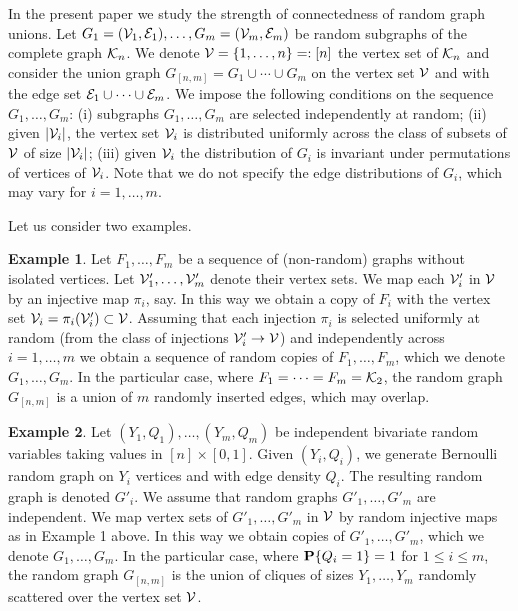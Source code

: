 \documentclass[11pt, a4paper]{article}
\newcommand{\PP}{{\bf{P}}}
\begin{document}
In the present paper we study the strength of connectedness
of random graph unions.
Let $G_1=({\cal V}_1,{\cal E}_1),\dots, G_m=({\cal V}_m,
{\cal E}_m)$ be random subgraphs of the complete graph 
${\cal K}_n$.  
We denote ${\cal V}=\{1,\dots, n\}=:[n]$
 the vertex set of ${\cal K}_n$ and consider
   the union graph $G_{[n,m]}=G_1\cup\cdots\cup G_m$ 
 on the vertex set ${\cal V}$ and with the edge 
 set ${\cal E}_1\cup\cdots\cup{\cal E}_m$.
%
We impose the following  conditions on the sequence 
$G_1,\dots, G_m$: (i) subgraphs $G_1,\dots, G_m$ are selected  independently at random;
 (ii)  given $|{\cal V}_i|$, the vertex set ${\cal V}_i$
is distributed uniformly across the class of subsets of ${\cal V}$ of size $|{\cal V}_i|$;
(iii) given ${\cal V}_i$ the distribution of $G_i$ is 
invariant under permutations of  vertices 
of ${\cal V}_i$. %
Note that we do not specify the edge distributions of 
$G_i$, which may vary for $i=1,\dots, m$. 

Let us consider  two examples.

{\bf{Example 1}}. Let  $F_1,\dots, F_m$
be a sequence of (non-random) graphs without isolated vertices. 
Let ${\cal V}_1',\dots,{\cal V}'_m$ denote their vertex sets.
We
 map each ${\cal V}'_i$ in ${\cal V}$ by 
an injective map $\pi_i$, say. In this way we obtain
a copy of $F_i$ with the vertex 
set ${\cal V}_i=\pi_i({\cal V}'_i)\subset {\cal V}$.
Assuming that each 
injection $\pi_i$  is selected uniformly at random 
(from the class of injections ${\cal V}'_i\to{\cal V}$)
and 
independently across $i=1,\dots, m$ we obtain a sequence 
of random copies of $F_1,\dots, F_m$, which we denote $G_1,\dots, G_m$. 
In the particular case, where $F_1=\cdots=F_m={\cal K}_2$,
the random graph $G_{[n,m]}$ is a union of $m$ randomly inserted edges, which may overlap. 




{\bf{Example 2}}. 
Let 
$(Y_1,Q_1),\dots,(Y_m,Q_m)$ be 
independent bivariate random variables 
taking values in $[n]\times [0,1]$. 
Given $(Y_i,Q_i)$, we generate Bernoulli random graph  on $Y_i$ vertices and with edge density $Q_i$. The resulting random graph is denoted $G'_i$.
We assume that random graphs $G'_1,\dots, G'_m$ are independent. 
We  map
vertex sets of $G'_1,\dots, G'_m$ in ${\cal V}$ by 
random injective maps as in Example 1 
above. In this way we obtain copies 
of $G'_1,\dots, G'_m$, which we denote
$G_1,\dots, G_m$. In the particular case, where $\PP\{Q_i=1\}=1$ for $1\le i\le m$, the random graph $G_{[n,m]}$ is the union of  cliques of sizes $Y_1,\dots, Y_m$ randomly scattered over the vertex set ${\cal V}$.
 
\end{document}
